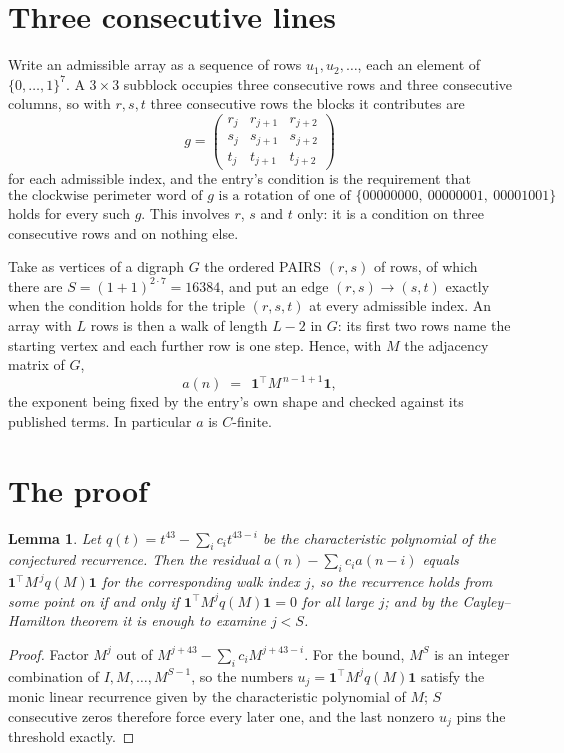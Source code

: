 \documentclass[11pt,a4paper]{article}
\theoremstyle{plain}
\newtheorem{lemma}[theorem]{Lemma}
\theoremstyle{definition}
\begin{document}
\section{Three consecutive lines}

Write an admissible array as a sequence of rows $u_1,u_2,\dots$, each an element of
$\{0,\dots,1\}^{7}$. A $3\times3$ subblock occupies three consecutive rows and
three consecutive columns, so with $r,s,t$ three consecutive rows the blocks it
contributes are
\[
g=\begin{pmatrix}r_j&r_{j+1}&r_{j+2}\\ s_j&s_{j+1}&s_{j+2}\\ t_j&t_{j+1}&t_{j+2}\end{pmatrix}
\]
for each admissible index, and the entry's condition is the requirement that
\[
\text{the clockwise perimeter word of }g\text{ is a rotation of one of }\{00000000,\ 00000001,\ 00001001\}
\]
holds for every such $g$. This involves $r$, $s$ and $t$ only: it is a condition on
three consecutive rows and on nothing else.

Take as vertices of a digraph $G$ the ordered PAIRS $(r,s)$ of rows, of which there are
$S=(1+1)^{2\cdot7}=16384$, and put an edge $(r,s)\to(s,t)$ exactly when the condition
holds for the triple $(r,s,t)$ at every admissible index. An array with $L$ rows is then a
walk of length $L-2$ in $G$: its first two rows name the starting vertex and each further
row is one step. Hence, with $M$ the adjacency matrix of $G$,
\[
a(n)\;=\;\,\mathbf{1}^{\!\top}M^{\,n-1+1}\mathbf{1},
\]
the exponent being fixed by the entry's own shape and checked against its published terms.
In particular $a$ is $C$-finite.

\section{The proof}

\begin{lemma}\label{lem:crit}
Let $q(t)=t^{43}-\sum_i c_it^{43-i}$ be the characteristic polynomial of the
conjectured recurrence. Then the residual $a(n)-\sum_ic_ia(n-i)$ equals
$\mathbf{1}^{\!\top}M^{\,j}q(M)\mathbf{1}$ for the corresponding walk index
$j$, so the recurrence holds from some point on if and only if
$\mathbf{1}^{\!\top}M^{j}q(M)\mathbf{1}=0$ for all large $j$; and by the
Cayley--Hamilton theorem it is enough to examine $j<S$.
\end{lemma}

\begin{proof}
Factor $M^{j}$ out of $M^{j+43}-\sum_ic_iM^{j+43-i}$. For the bound, $M^{S}$
is an integer combination of $I,M,\dots,M^{S-1}$, so the numbers
$u_j=\mathbf{1}^{\!\top}M^{j}q(M)\mathbf{1}$ satisfy the monic linear recurrence given by
the characteristic polynomial of $M$; $S$ consecutive zeros therefore force every later one,
and the last nonzero $u_j$ pins the threshold exactly.
\end{proof}
\end{document}
